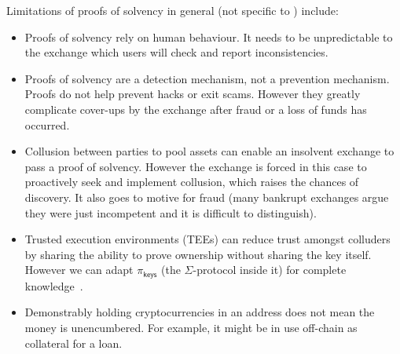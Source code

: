 Limitations of proofs of solvency in general (not specific to \Sys) include:

\begin{itemize}
\item Proofs of solvency rely on human behaviour. It needs to be unpredictable to the exchange which users will check and report inconsistencies.
\item Proofs of solvency are a detection mechanism, not a prevention mechanism. Proofs do not help prevent hacks or exit scams. However they greatly complicate cover-ups by the exchange after fraud or a loss of funds has occurred.
\item Collusion between parties to pool assets can enable an insolvent exchange to pass a proof of solvency. However the exchange is forced in this case to proactively seek and implement collusion, which raises the chances of discovery. It also goes to motive for fraud (many bankrupt exchanges argue they were just incompetent and it is difficult to distinguish). 
\item Trusted execution environments (TEEs) can reduce trust amongst colluders by sharing the ability to prove ownership without sharing the key itself. However we can adapt $\pi_\mathsf{keys}$ (the $\Sigma$-protocol inside it) for complete knowledge~\cite{completeknowledge}.
\item Demonstrably holding cryptocurrencies in an address does not mean the money is unencumbered. For example, it might be in use off-chain as collateral for a loan. 
\end{itemize}

